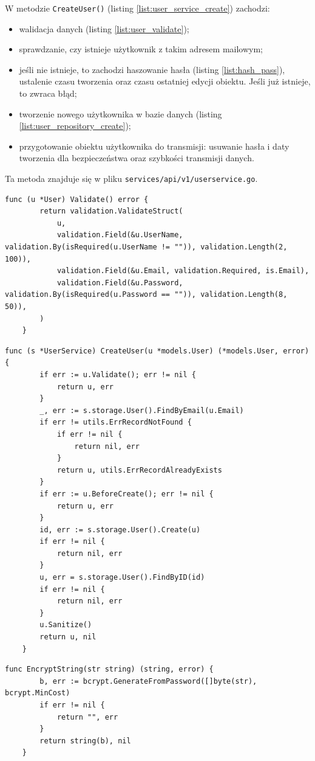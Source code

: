 W metodzie \texttt{CreateUser()} (listing \ref{list:user_service_create}) zachodzi:
\begin{itemize}
\item walidacja danych (listing \ref{list:user_validate});
\item sprawdzanie, czy istnieje użytkownik z takim adresem mailowym;
\item jeśli nie istnieje, to zachodzi haszowanie hasła (listing \ref{list:hash_pass}), ustalenie czasu tworzenia oraz czasu ostatniej edycji obiektu. Jeśli już istnieje, to zwraca błąd;
\item tworzenie nowego użytkownika w bazie danych (listing \ref{list:user_repository_create});
\item przygotowanie obiektu użytkownika do transmisji: usuwanie hasła i daty tworzenia dla bezpieczeństwa oraz szybkości transmisji danych.
\end{itemize}
Ta metoda znajduje się w pliku \texttt{services/api/v1/userservice.go}.


\begin{lstlisting}[label=list:user_validate,caption=Walidacja danych użytkownika,basicstyle=\tiny\ttfamily]
    func (u *User) Validate() error {
        return validation.ValidateStruct(
            u,
            validation.Field(&u.UserName, validation.By(isRequired(u.UserName != "")), validation.Length(2, 100)),
            validation.Field(&u.Email, validation.Required, is.Email),
            validation.Field(&u.Password, validation.By(isRequired(u.Password == "")), validation.Length(8, 50)),
        )
    }
\end{lstlisting}
\begin{lstlisting}[label=list:user_service_create,caption=Serwis tworzenia użytkownika,basicstyle=\tiny\ttfamily]
    func (s *UserService) CreateUser(u *models.User) (*models.User, error) {
        if err := u.Validate(); err != nil {
            return u, err
        }
        _, err := s.storage.User().FindByEmail(u.Email)
        if err != utils.ErrRecordNotFound {
            if err != nil {
                return nil, err
            }
            return u, utils.ErrRecordAlreadyExists
        }
        if err := u.BeforeCreate(); err != nil {
            return u, err
        }
        id, err := s.storage.User().Create(u)
        if err != nil {
            return nil, err
        }
        u, err = s.storage.User().FindByID(id)
        if err != nil {
            return nil, err
        }
        u.Sanitize()
        return u, nil
    }
\end{lstlisting}
\begin{lstlisting}[label=list:hash_pass,caption=Haszowanie hasła,basicstyle=\tiny\ttfamily]
    func EncryptString(str string) (string, error) {
        b, err := bcrypt.GenerateFromPassword([]byte(str), bcrypt.MinCost)
        if err != nil {
            return "", err
        }
        return string(b), nil
    }
\end{lstlisting}

